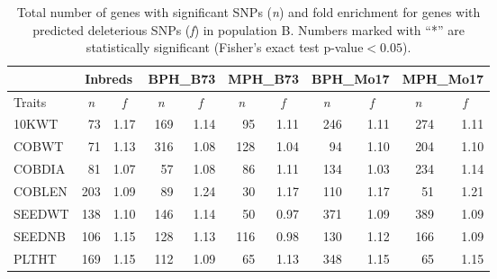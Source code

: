\documentclass[12pt]{article}
\begin{document}
\begin{table}[ht]
  \begin{center}
    \caption[]{Total number of genes with significant SNPs (\emph{n}) and fold enrichment for genes with predicted deleterious SNPs (\emph{f}) in population B. Numbers marked with ``*'' are statistically significant (Fisher's exact test p-value$<0.05$).}
{\fontsize{10}{10}\sf
      \begin{tabular}{l|rr|rr|rr|rr|rr} 
\toprule
\multicolumn{1}{c}{}	&	\multicolumn{2}{c}{Inbreds}	&	\multicolumn{2}{c}{BPH\_B73}	&	\multicolumn{2}{c}{MPH\_B73}	&	\multicolumn{2}{c}{BPH\_Mo17}	&	\multicolumn{2}{c}{MPH\_Mo17}	\\	\hline 
Traits	& 	 \multicolumn{1}{c}{\emph{n}} 	& 	\multicolumn{1}{c|}{\emph{f}} 	& 	\multicolumn{1}{c}{\emph{n}} 	& 	\multicolumn{1}{c|}{\emph{f}} 	& 	\multicolumn{1}{c}{\emph{n}} 	& 	\multicolumn{1}{c|}{\emph{f}}	& 	\multicolumn{1}{c}{\emph{n}} 	& 	\multicolumn{1}{c|}{\emph{f}}	& 	\multicolumn{1}{c}{\emph{n}}	&	\multicolumn{1}{c}{\emph{f}}	\\	\hline \hline 
10KWT	&	73	&	1.17	&	169	&	1.14	&	95	&	1.11	&	246	&	1.11	&	274	&	1.11	\\
COBWT	&	71	&	1.13	&	316	&	1.08	&	128	&	1.04	&	94	&	1.10	&	204	&	1.10	\\
COBDIA	&	81	&	1.07	&	57	&	1.08	&	86	&	1.11	&	134	&	1.03	&	234	&	1.14	\\
COBLEN	&	203	&	1.09	&	89	&	1.24	&	30	&	1.17	&	110	&	1.17	&	51	&	1.21	\\
SEEDWT	&	138	&	1.10	&	146	&	1.14	&	50	&	0.97	&	371	&	1.09	&	389	&	1.09	\\
SEEDNB	&	106	&	1.15	&	128	&	1.13	&	116	&	0.98	&	130	&	1.12	&	166	&	1.09	\\
PLTHT	&	169	&	1.15	&	112	&	1.09	&	65	&	1.13	&	348	&	1.15	&	65	&	1.15	\\
\bottomrule
      \end{tabular}
}
    \label{gene_enrichment_B}  
  \end{center}
\end{table}
\end{document}
